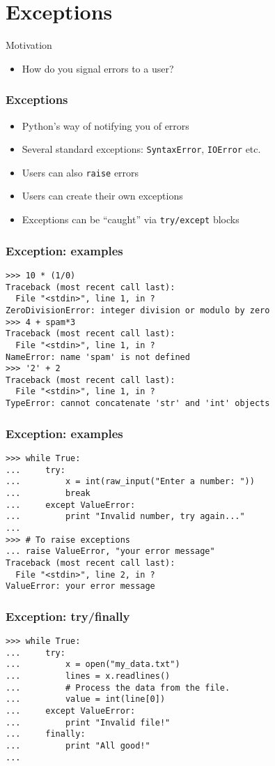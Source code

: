 \documentclass[12pt,presentation]{beamer}
\begin{document}
\section{Exceptions}

\begin{frame}{Motivation}
    \begin{itemize}
        \item How do you signal errors to a user?
    \end{itemize}
\end{frame}

\begin{frame}
  \frametitle{Exceptions}
  \begin{itemize}
  \item Python's way of notifying you of errors
  \item Several standard exceptions: \texttt{SyntaxError}, \texttt{IOError}
    etc.
  \item Users can also \texttt{raise} errors
  \item Users can create their own exceptions
  \item Exceptions can be ``caught'' via \texttt{try/except} blocks
  \end{itemize}
\end{frame}

\begin{frame}[fragile]
  \frametitle{Exception: examples}
\begin{lstlisting}
>>> 10 * (1/0)
Traceback (most recent call last):
  File "<stdin>", line 1, in ?
ZeroDivisionError: integer division or modulo by zero
>>> 4 + spam*3
Traceback (most recent call last):
  File "<stdin>", line 1, in ?
NameError: name 'spam' is not defined
>>> '2' + 2
Traceback (most recent call last):
  File "<stdin>", line 1, in ?
TypeError: cannot concatenate 'str' and 'int' objects
\end{lstlisting}
\end{frame}

\begin{frame}[fragile]
  \frametitle{Exception: examples}
\begin{lstlisting}
>>> while True:
...     try:
...         x = int(raw_input("Enter a number: "))
...         break
...     except ValueError:
...         print "Invalid number, try again..."
...
>>> # To raise exceptions
... raise ValueError, "your error message"
Traceback (most recent call last):
  File "<stdin>", line 2, in ?
ValueError: your error message
\end{lstlisting}
\end{frame}

\begin{frame}[fragile]
  \frametitle{Exception: try/finally}
\begin{lstlisting}
>>> while True:
...     try:
...         x = open("my_data.txt")
...         lines = x.readlines()
...         # Process the data from the file.
...         value = int(line[0])
...     except ValueError:
...         print "Invalid file!"
...     finally:
...         print "All good!"
...
\end{lstlisting}
\end{frame}
\end{document}
